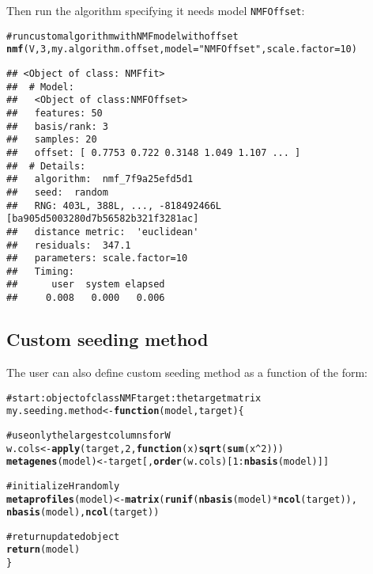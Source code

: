 \documentclass[a4paper]{article}\usepackage{graphicx, color}
\makeatletter
\newcommand{\hlfunctioncall}[1]{\textcolor[rgb]{0.501960784313725,0,0.329411764705882}{\textbf{#1}}}%
\newcommand{\hlstring}[1]{\textcolor[rgb]{0.6,0.6,1}{#1}}%
\newcommand{\hlcomment}[1]{\textcolor[rgb]{0.180392156862745,0.6,0.341176470588235}{#1}}%
\newenvironment{kframe}{%
 \def\at@end@of@kframe{}%
 \ifinner\ifhmode%
  \def\at@end@of@kframe{\end{minipage}}%
  \begin{minipage}{\columnwidth}%
 \fi\fi%
 \def\FrameCommand##1{\hskip\@totalleftmargin \hskip-\fboxsep
 \colorbox{shadecolor}{##1}\hskip-\fboxsep
     \hskip-\linewidth \hskip-\@totalleftmargin \hskip\columnwidth}%
 \MakeFramed {\advance\hsize-\width
   \@totalleftmargin\z@ \linewidth\hsize
   \@setminipage}}%
 {\par\unskip\endMakeFramed%
 \at@end@of@kframe}
\newenvironment{knitrout}{}{} %
\let\code=\texttt
\makeatother
\begin{document}
Then run the algorithm specifying it needs model \code{NMFOffset}:
\begin{knitrout}
\color{fgcolor}\begin{kframe}
\begin{alltt}
\hlcomment{# run custom algorithm with NMF model with offset}
\hlfunctioncall{nmf}(V, 3, my.algorithm.offset, model = \hlstring{"NMFOffset"}, scale.factor = 10)
\end{alltt}
\begin{verbatim}
## <Object of class: NMFfit>
##  # Model:
##   <Object of class:NMFOffset>
##   features: 50 
##   basis/rank: 3 
##   samples: 20 
##   offset: [ 0.7753 0.722 0.3148 1.049 1.107 ... ]
##  # Details:
##   algorithm:  nmf_7f9a25efd5d1 
##   seed:  random 
##   RNG: 403L, 388L, ..., -818492466L [ba905d5003280d7b56582b321f3281ac]
##   distance metric:  'euclidean' 
##   residuals:  347.1 
##   parameters: scale.factor=10 
##   Timing:
##      user  system elapsed 
##     0.008   0.000   0.006
\end{verbatim}
\end{kframe}
\end{knitrout}



\subsection{Custom seeding method}\label{sec:seed_custom}

The user can also define custom seeding method as a function of the form:


\begin{knitrout}
\color{fgcolor}\begin{kframe}
\begin{alltt}

\hlcomment{# start: object of class NMF target: the target matrix}
my.seeding.method <- \hlfunctioncall{function}(model, target) \{
    
    \hlcomment{# use only the largest columns for W}
    w.cols <- \hlfunctioncall{apply}(target, 2, \hlfunctioncall{function}(x) \hlfunctioncall{sqrt}(\hlfunctioncall{sum}(x^2)))
    \hlfunctioncall{metagenes}(model) <- target[, \hlfunctioncall{order}(w.cols)[1:\hlfunctioncall{nbasis}(model)]]
    
    \hlcomment{# initialize H randomly}
    \hlfunctioncall{metaprofiles}(model) <- \hlfunctioncall{matrix}(\hlfunctioncall{runif}(\hlfunctioncall{nbasis}(model) * \hlfunctioncall{ncol}(target)), 
        \hlfunctioncall{nbasis}(model), \hlfunctioncall{ncol}(target))
    
    \hlcomment{# return updated object}
    \hlfunctioncall{return}(model)
\}
\end{alltt}
\end{kframe}
\end{knitrout}
\end{document}
